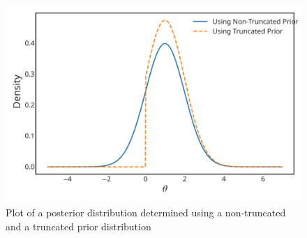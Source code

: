 {\begin{figure}[h!]
\includegraphics{images/truncposterior.svg}
\caption{Plot of a posterior distribution determined using a
non-truncated and a truncated prior distribution}


\end{figure}}
\clearpage

